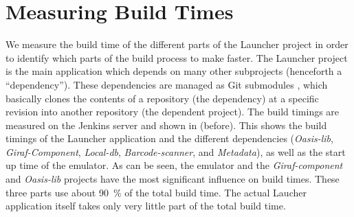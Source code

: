 \section{Measuring Build Times}\label{sec:measuring_build_times}
We measure the build time of the different parts of the Launcher project in order to identify which parts of the build process to make faster. The Launcher project is the main application which depends on many other subprojects (henceforth a ``dependency''). These dependencies are managed as Git submodules \parencite{git-submodules-doc}, which basically clones the contents of a repository (the dependency) at a specific revision into another repository (the dependent project). The build timings are measured on the Jenkins server and shown in  (before). This shows the build timings of the Launcher application and the different dependencies (\emph{Oasis-lib}, \emph{Giraf-Component}, \emph{Local-db}, \emph{Barcode-scanner}, and \emph{Metadata}), as well as the start up time of the emulator. As can be seen, the emulator and the \emph{Giraf-component} and \emph{Oasis-lib} projects have the most significant influence on build times. These three parts use about \SI{90}{\percent} of the total build time. The actual Laucher application itself takes only very little part of the total build time.

